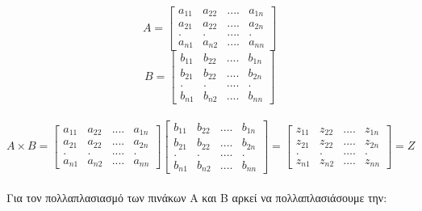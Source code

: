 \documentclass[12pt]{article}
\begin{document}
$$A = \begin{bmatrix}
a_{11} & a_{22} & . . . . & a_{1n} \\
a_{21} & a_{22} & . . . . & a_{2n} \\
. & . & . . . . & . \\
a_{n1} & a_{n2} & . . . . & a_{nn}
\end{bmatrix}$$
$$B = \begin{bmatrix}
b_{11} & b_{22} & . . . . & b_{1n} \\
b_{21} & b_{22} & . . . . & b_{2n} \\
. & . & . . . . & . \\
b_{n1} & b_{n2} & . . . . & b_{nn}
\end{bmatrix}$$
\\
$$ Α\times B =
\begin{bmatrix}
a_{11} & a_{22} & . . . . & a_{1n} \\
a_{21} & a_{22} & . . . . & a_{2n} \\
. & . & . . . . & . \\
a_{n1} & a_{n2} & . . . . & a_{nn}
\end{bmatrix}
\begin{bmatrix}
b_{11} & b_{22} & . . . . & b_{1n} \\
b_{21} & b_{22} & . . . . & b_{2n} \\
. & . & . . . . & . \\
b_{n1} & b_{n2} & . . . . & b_{nn}
\end{bmatrix} =
\begin{bmatrix}
z_{11} & z_{22} & . . . . & z_{1n} \\
z_{21} & z_{22} & . . . . & z_{2n} \\
. & . & . . . . & . \\
z_{n1} & z_{n2} & . . . . & z_{nn}
\end{bmatrix} = Ζ
$$
\\

Για τον πολλαπλασιασμό των πινάκων Α και Β αρκεί να πολλαπλασιάσουμε την:
\end{document}
